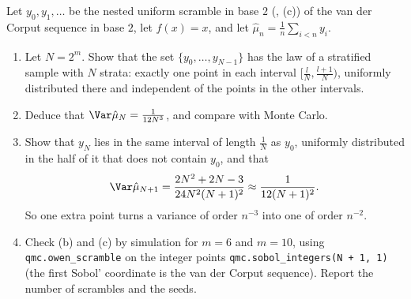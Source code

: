 \begin{exercise}\label{ex:qmc-scrambled-vdc}
\medium Let $y_0,y_1,\dots$ be the nested uniform scramble in base $2$
(, (c)) of the van der Corput sequence in base $2$, let $f(x)=x$, and
let $\hat\mu_n=\frac1n\sum_{i<n}y_i$.
\begin{enumerate}[label=(\alph*)]
  \item Let $N=2^m$. Show that the set $\{y_0,\dots,y_{N-1}\}$ has the law of a stratified
    sample with $N$ strata: exactly one point in each interval $[\frac lN,\frac{l+1}N)$, uniformly
    distributed there and independent of the points in the other intervals.
  \item Deduce that $\Var\hat\mu_N=\frac1{12N^3}$, and compare with Monte Carlo.
  \item Show that $y_N$ lies in the same interval of length $\frac1N$ as $y_0$, uniformly
    distributed in the half of it that does not contain $y_0$, and that
    \[
      \Var\hat\mu_{N+1}=\frac{2N^2+2N-3}{24N^2(N+1)^2}\approx\frac1{12(N+1)^2}.
    \]
    So one extra point turns a variance of order $n^{-3}$ into one of order $n^{-2}$.
  \item Check (b) and (c) by simulation for $m=6$ and $m=10$, using \texttt{qmc.owen\_scramble}
    on the integer points \texttt{qmc.sobol\_integers(N + 1, 1)} (the first Sobol' coordinate is
    the van der Corput sequence). Report the number of scrambles and the seeds.
\end{enumerate}
\end{exercise}


